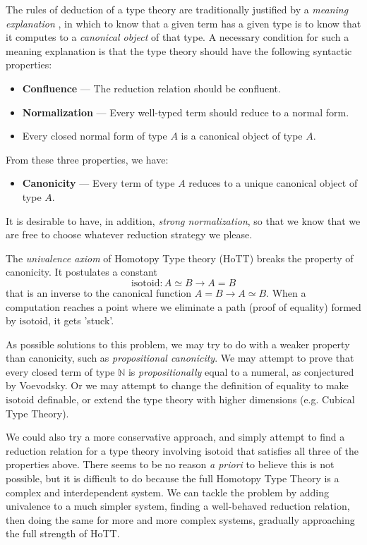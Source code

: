 \documentclass[a4paper,UKenglish]{lipics-v2016}
\newcommand*{\isotoid}{\ensuremath{\mathrm{isotoid}}}
\theoremstyle{plain}
\begin{document}
The rules of deduction of a type theory are traditionally justified by a \emph{meaning explanation} \cite{ML:ITT}, in which to know that a given term has a given type is to know that it computes to a \emph{canonical object} of that type.  A necessary condition for such a meaning explanation is that the type theory should have the following syntactic properties:
\begin{itemize}
\item \textbf{Confluence} --- The reduction relation should be confluent.
\item \textbf{Normalization} --- Every well-typed term should reduce to a normal form.
\item Every closed normal form of type $A$ is a canonical object of type $A$.
\end{itemize}
From these three properties, we have:
\begin{itemize}
\item \textbf{Canonicity} --- Every term of type $A$ reduces to a unique canonical object of type $A$.
\end{itemize}

It is desirable to have, in addition, \emph{strong normalization}, so that we know that we are free to choose whatever reduction strategy we please.

The \emph{univalence axiom} of Homotopy Type theory (HoTT) \cite{hottbook} breaks the property of canonicity.  It postulates a
constant
\[ \isotoid : A \simeq B \rightarrow A = B \]
that is an inverse to the canonical function $A = B \rightarrow A \simeq B$.  When a computation reaches a point
where we eliminate a path (proof of equality) formed by $\isotoid$, it gets 'stuck'.

As possible solutions to this problem, we may try to do with a weaker property than canonicity, such as \emph{propositional canonicity}.
We may attempt to prove that every closed term of type $\mathbb{N}$ is \emph{propositionally} equal to a numeral, as conjectured by Voevodsky.  Or we may attempt to change the definition of equality to make $\isotoid$ definable\cite{Polonsky14a}, or extend the type theory with higher dimensions (e.g. Cubical Type Theory\cite{cchm:cubical}).

We could also try a more conservative approach, and simply attempt to find a reduction relation for a type theory involving $\isotoid$ that satisfies
all three of the properties above.  There seems to be no reason \emph{a priori} to believe this is not possible, but it is difficult to do because
the full Homotopy Type Theory is a complex and interdependent system.  We can tackle the problem by adding univalence to a much simpler system, finding
a well-behaved reduction relation, then doing the same for more and more complex systems, gradually approaching the full strength of HoTT.
\end{document}
